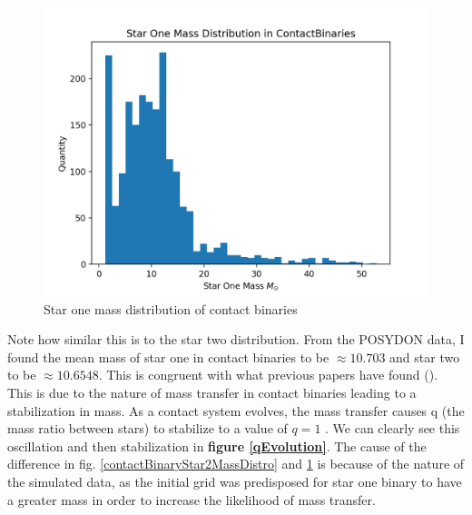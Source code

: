 \documentclass[12pt, a4paper]{article}
\begin{document}
        \begin{figure}[H]
            \centering
            \includegraphics[scale = .4]{figs/GeneratedFigs/W_UMa/ContactBinaries_Star_One_Mass_Distribution.png}
            \caption{Star one mass distribution of contact binaries}
            \label{contactBinarStar1MassDistro}
        \end{figure}

        Note how similar this is to the star two distribution. From the POSYDON data, I found the mean mass of star one in contact binaries to be $\approx 10.703$ and star two to be $\approx 10.6548$. This is congruent with what previous papers have found (\parencite{Fabry_2025}). This is due to the nature of mass transfer in contact binaries leading to a stabilization in mass. As a contact system evolves, the mass transfer causes q (the mass ratio between stars) to stabilize to a value of $q=1$ \parencite{Fabry_2025}. We can clearly see this oscillation and then stabilization in \textbf{figure \ref{qEvolution}}. The cause of the difference in fig. \ref{contactBinaryStar2MassDistro} and \ref{contactBinarStar1MassDistro} is because of the nature of the simulated data, as the initial grid was predisposed for star one binary to have a greater mass in order to increase the likelihood of mass transfer.
\end{document}
